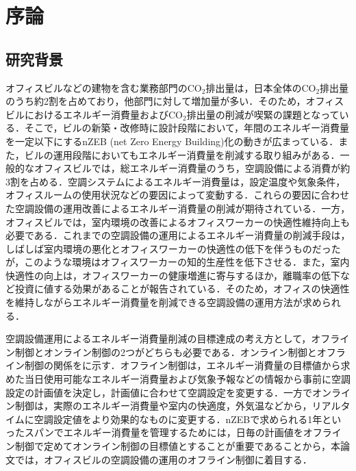 \chapter{序論}
\label{chap::intro}

\section{研究背景}
オフィスビルなどの建物を含む業務部門のCO$_2$排出量は，日本全体のCO$_2$排出量のうち約2割を占めており，他部門に対して増加量が多い\cite{EDMC15}．そのため，オフィスビルにおけるエネルギー消費量およびCO$_2$排出量の削減が喫緊の課題となっている．そこで，ビルの新築・改修時に設計段階において，年間のエネルギー消費量を一定以下にするnZEB (net Zero Energy Building)化の動きが広まっている\cite{Shigen16}．また，ビルの運用段階においてもエネルギー消費量を削減する取り組みがある．一般的なオフィスビルでは，総エネルギー消費量のうち，空調設備による消費が約3割を占める\cite{Kanto11}．空調システムによるエネルギー消費量は，設定温度や気象条件，オフィスルームの使用状況などの要因によって変動する．これらの要因に合わせた空調設備の運用改善によるエネルギー消費量の削減が期待されている\cite{EIA17, Enecho17}．一方，オフィスビルでは，室内環境の改善によるオフィスワーカーの快適性維持向上も必要である．これまでの空調設備の運用によるエネルギー消費量の削減手段は，しばしば室内環境の悪化とオフィスワーカーの快適性の低下を伴うものだったが，このような環境はオフィスワーカーの知的生産性を低下させる\cite{Iwahashi14}．また，室内快適性の向上は，オフィスワーカーの健康増進に寄与するほか，離職率の低下など投資に値する効果があることが報告されている\cite{WGBC14}．そのため，オフィスの快適性を維持しながらエネルギー消費量を削減できる空調設備の運用方法が求められる．

空調設備運用によるエネルギー消費量削減の目標達成の考え方として，オフライン制御とオンライン制御の2つがどちらも必要である\cite{Kamimura08}．オンライン制御とオフライン制御の関係をに示す．オフライン制御は，エネルギー消費量の目標値から求めた当日使用可能なエネルギー消費量および気象予報などの情報から事前に空調設定の計画値を決定し，計画値に合わせて空調設定を変更する．一方でオンライン制御は，実際のエネルギー消費量や室内の快適度，外気温などから，リアルタイムに空調設定値をより効果的なものに変更する．nZEBで求められる1年といったスパンでエネルギー消費量を管理するためには，日毎の計画値をオフライン制御で定めてオンライン制御の目標値とすることが重要であることから，本論文では，オフィスビルの空調設備の運用のオフライン制御に着目する．

